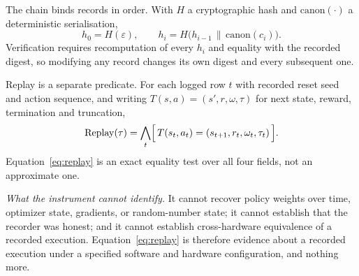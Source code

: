 \documentclass[11pt,a4paper]{article}
\begin{document}
The chain binds records in order. With $H$ a cryptographic hash and $\mathrm{canon}(\cdot)$ a deterministic serialisation,
\begin{equation}
\label{eq:chain}
h_{0} = H(\varepsilon), \qquad h_{i} = H\bigl(h_{i-1} \,\|\, \mathrm{canon}(c_{i})\bigr).
\end{equation}
Verification requires recomputation of every $h_{i}$ and equality with the recorded digest, so modifying any record changes its own digest and every subsequent one.

Replay is a separate predicate. For each logged row $t$ with recorded reset seed and action sequence, and writing $T(s,a)=(s',r,\omega,\tau)$ for next state, reward, termination and truncation,
\begin{equation}
\label{eq:replay}
\mathrm{Replay}(\tau) = \bigwedge_{t}\Bigl[\, T(s_{t},a_{t}) = (s_{t+1}, r_{t}, \omega_{t}, \tau_{t}) \,\Bigr].
\end{equation}
Equation~\eqref{eq:replay} is an exact equality test over all four fields, not an approximate one.

\emph{What the instrument cannot identify.} It cannot recover policy weights over time, optimizer state, gradients, or random-number state; it cannot establish that the recorder was honest; and it cannot establish cross-hardware equivalence of a recorded execution. Equation~\eqref{eq:replay} is therefore evidence about a recorded execution under a specified software and hardware configuration, and nothing more.
\end{document}
